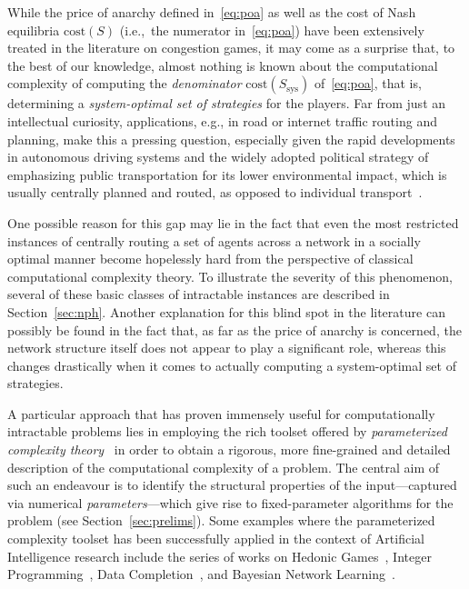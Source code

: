 \documentclass[letterpaper]{article} %
\begin{document}
While the price of anarchy defined in~\eqref{eq:poa} as well as the cost of Nash equilibria $\mathrm{cost}(S)$ (i.e.,~the numerator in~\eqref{eq:poa}) have been extensively treated in the literature on congestion games, it may come as a surprise that, to the best of our knowledge, almost nothing is known about the computational complexity of computing the \emph{denominator} $\mathrm{cost}(S_\mathrm{sys})$ of~\eqref{eq:poa}, that is, determining a \emph{system-optimal set of strategies} for the players. Far from just an intellectual curiosity, applications, e.g., in road or internet traffic routing and planning, make this a pressing question, especially given the rapid developments in autonomous driving systems and the widely adopted political strategy of emphasizing public transportation for its lower environmental impact, which is usually centrally planned and routed, as opposed to individual transport~\cite{sharon2017real,sharon2017network,chen2020path,sharon2021alleviating,jalota2023balancing}.

One possible reason for this gap may lie in the fact that even the most restricted instances of centrally routing a set of agents across a network in a socially optimal manner become hopelessly hard from the perspective of classical computational complexity theory. To illustrate the severity of this phenomenon, several of these basic classes of intractable instances are described in Section~\ref{sec:nph}.
Another explanation for this blind spot in the literature can possibly be found in the fact that, as far as the price of anarchy is concerned, the network structure itself does not appear to play a significant role, whereas this changes drastically when it comes to actually computing a system-optimal set of strategies.

A particular approach that has proven immensely useful for computationally intractable problems lies in employing the rich toolset offered by \emph{parameterized complexity theory}~\cite{DowneyF13,CyganFKLMPPS15} in order to obtain a rigorous, more fine-grained and detailed description of the computational complexity of a problem. The central aim of such an endeavour is to identify the structural properties of the input---captured via numerical \emph{parameters}---which give rise to fixed-parameter algorithms for the problem (see Section~\ref{sec:prelims}).
Some examples where the parameterized complexity toolset has been successfully applied in the context of Artificial Intelligence research include the series of works on Hedonic Games~\cite{BoehmerE20,BoehmerE20b,GanianHKSS22}, Integer Programming~\cite{GanianO18,EibenGKO19,DvorakEGKO21,ChanCKKP22}, Data Completion~\cite{GanianKOS18,DahiyaFPS21,GanianHKOS22,KoanaFN23}, and Bayesian Network Learning~\cite{OrdyniakS13,GruttemeierKM21,GanianK21,GruttemeierK22}.
\end{document}

